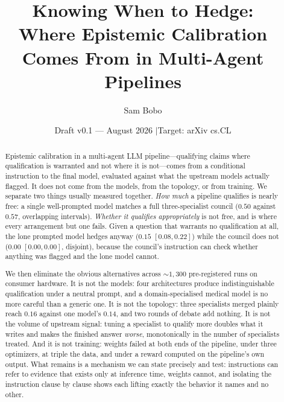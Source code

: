 \documentclass[11pt]{article}
\title{\textbf{Knowing When to Hedge:\\ Where Epistemic Calibration Comes From
in Multi-Agent Pipelines}}
\author{Sam Bobo}
\date{Draft v0.1 --- August 2026 \quad$\vert$\quad Target: arXiv cs.CL}
\begin{document}
\sloppy
\maketitle

\begin{abstract}
\noindent
Epistemic calibration in a multi-agent LLM pipeline---qualifying claims where
qualification is warranted and not where it is not---comes from a conditional
instruction to the final model, evaluated against what the upstream models
actually flagged. It does not come from the models, from the topology, or from
training. We separate two things usually measured together. \emph{How much} a
pipeline qualifies is nearly free: a single well-prompted model matches a
full three-specialist council ($0.50$ against $0.57$, overlapping intervals).
\emph{Whether it qualifies appropriately} is not free, and is where every
arrangement but one fails. Given a question that warrants no qualification at
all, the lone prompted model hedges anyway ($0.15$ $[0.08,0.22]$) while the
council does not ($0.00$ $[0.00,0.00]$, disjoint), because the council's
instruction can check whether anything was flagged and the lone model cannot.

We then eliminate the obvious alternatives across ${\sim}1{,}300$
pre-registered runs on consumer hardware. It is not the models: four
architectures produce indistinguishable qualification under a neutral prompt,
and a domain-specialised medical model is no more careful than a generic one.
It is not the topology: three specialists merged plainly reach $0.16$ against
one model's $0.14$, and two rounds of debate add nothing. It is not the volume
of upstream signal: tuning a specialist to qualify more doubles what it writes
and makes the finished answer \emph{worse}, monotonically in the number of
specialists treated. And it is not training: weights failed at both ends of
the pipeline, under three optimizers, at triple the data, and under a reward
computed on the pipeline's own output. What remains is a mechanism we can
state precisely and test: instructions can refer to evidence that exists only
at inference time, weights cannot, and isolating the instruction clause by
clause shows each lifting exactly the behavior it names and no other.
\end{abstract}
\end{document}
